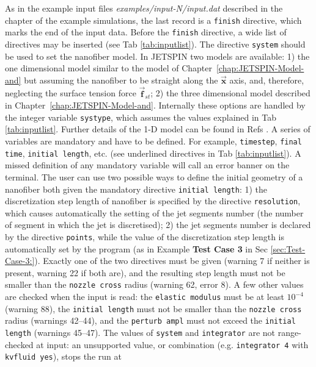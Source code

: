 As in the example input files \textit{examples/input-N/input.dat}
described in the chapter of the example simulations, the last record is
a \texttt{finish} directive, which marks the end of the input data.
Before the \texttt{finish} directive, a wide list of directives may
be inserted (see Tab \ref{tab:inputlist}). The directive \texttt{system}
should be used to set the nanofiber model. In JETSPIN two models are
available: 1) the one dimensional model similar to the model of
Chapter~\ref{chap:JETSPIN-Model-and} but assuming the nanofiber to be straight
along the $\vec{\textbf{x}}$ axis, and, therefore, neglecting the
surface tension force $\vec{\textbf{f}}_{st}$; 2) the three dimensional
model described in Chapter~\ref{chap:JETSPIN-Model-and}. Internally these
options are handled by the integer variable \texttt{systype}, which
assumes the values explained in Tab \ref{tab:inputlist}. Further
details of the 1-D model can be found in Refs \cite{pontrelli2014electrospinning,carroll2011discretized}.
A series of variables are mandatory and have to be defined. For example,
\texttt{timestep}, \texttt{final time}, \texttt{initial length}, etc.
(see underlined directives in Tab \ref{tab:inputlist}). A missed
definition of any mandatory variable will call an error banner on
the terminal. The user can use two possible ways to define the initial
geometry of a nanofiber both given the mandatory directive \texttt{initial
length}: 1) the discretization step length of nanofiber is specified
by the directive \texttt{resolution}, which causes automatically the
setting of the jet segments number (the number of segment in which
the jet is discretised); 2) the jet segments number is declared by
the directive \texttt{points}, while the value of the discretization
step length is automatically set by the program (as in Example \textbf{Test
Case 3} in Sec \ref{sec:Test-Case-3:}). Exactly one of the two directives
must be given (warning 7 if neither is present, warning 22 if both are),
and the resulting step length must not be smaller than the \texttt{nozzle
cross} radius (warning 62, error 8). A few other values are checked when
the input is read: the \texttt{elastic modulus} must be at least
$10^{-4}$ (warning 88), the \texttt{initial length} must not be smaller
than the \texttt{nozzle cross} radius (warnings 42--44), and the
\texttt{perturb ampl} must not exceed the \texttt{initial length}
(warnings 45--47). The values of \texttt{system} and \texttt{integrator}
are not range-checked at input: an unsupported value, or combination
(e.g. \texttt{integrator 4} with \texttt{kvfluid yes}), stops the run at
